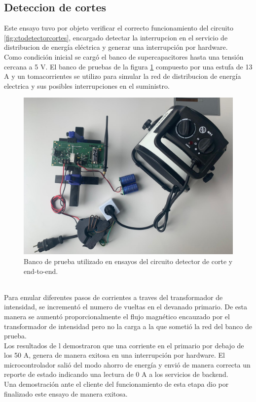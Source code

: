 \vspace{200px}
\subsection{Deteccion de cortes}
Este ensayo tuvo por objeto verificar el correcto funcionamiento del circuito \ref{fig:ctodetectorcortes}, encargado detectar la interrupcion en el servicio de distribucion de energía el\'{e}ctrica y generar una interrupci\'{o}n por hardware.\\
Como condici\'{o}n inicial se carg\'{o} el banco de supercapacitores hasta una tensión cercana a 5 V. 
El banco de pruebas de la figura \ref{fig:bancopruebae2e2} compuesto por una estufa de 13 A y un tomacorrientes se utilizo para simular la red de distribucion de energía electrica y sus posibles interrupciones en el suministro.\\
\begin{figure}[h]
	\centering
	\includegraphics[width=1.0\linewidth]{Figures/banco_prueba_e2e_1}
	\caption{Banco de prueba utilizado en ensayos del circuito detector de corte y end-to-end.}
	\label{fig:bancopruebae2e2}
\end{figure}\\
Para emular diferentes pasos de corrientes a traves del transformador de intensidad, se increment\'{o} el numero de vueltas en el devanado primario. De esta manera se aument\'{o} proporcionalmente el flujo magn\'{e}tico encauzado por el transformador de intensidad pero no la carga a la que someti\'{o} la red del banco de prueba.\\
Los resultados de l demostraron que una corriente en el primario por debajo de los 50 A, genera de manera exitosa en una interrupci\'{o}n por hardware. El microcontrolador sali\'{o} del modo ahorro de energía y envi\'{o} de manera correcta un reporte de estado indicando una lectura de 0 A a los servicios de backend.\\
Una demostraci\'{o}n ante el cliente del funcionamiento de esta etapa dio por finalizado este ensayo de manera exitosa.\\

